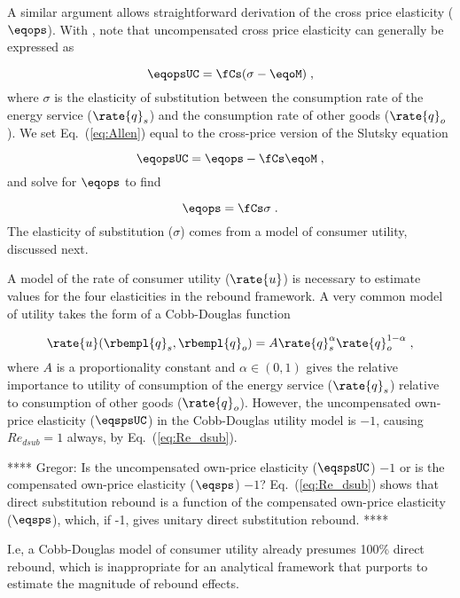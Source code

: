 A similar argument allows straightforward derivation 
of the cross price elasticity ($\eqops$).
With \citet{Hicks1934}, 
note that uncompensated cross price elasticity can generally be expressed as

\begin{equation} \label{eq:Allen}
  \eqopsUC = \fCs (\sigma - \eqoM) \; ,
\end{equation}
%
where $\sigma$ is the elasticity of substitution 
between the consumption rate of the energy service ($\rate{q}_s$) and
the consumption rate of other goods ($\rate{q}_o$). 
We set Eq.~(\ref{eq:Allen}) equal to 
the cross-price version of the Slutsky equation

\begin{equation} \label{eq:slutsky_cross}
  \eqopsUC = \eqops - \fCs \eqoM \; ,
\end{equation}
%
and solve for $\eqops$ to find

\begin{equation} \label{eq:eqops_general}
  \eqops = \fCs \sigma \; .
\end{equation}
%
The elasticity of substitution ($\sigma$)
comes from a model of consumer utility, discussed next.

A model of the rate of consumer utility ($\rate{u}$)
is necessary to estimate values for the four elasticities
in the rebound framework.
A very common model of utility takes the form of a Cobb-Douglas function

\begin{equation} \label{eq:CD_utility}
  \rate{u}(\rbempl{q}_s,\rbempl{q}_o) = A \rate{q}_s^\alpha \rate{q}_o^{1 - \alpha} \; ,
\end{equation}
%
where $A$ is a proportionality constant and 
$\alpha \in (0,1)$ gives the relative importance to utility 
of consumption of the energy service ($\rate{q}_s$)
relative to consumption of other goods ($\rate{q}_o$). 
However, the uncompensated own-price elasticity ($\eqspsUC$) 
in the Cobb-Douglas utility model is $-1$, 
causing $Re_{dsub} = 1$ always,
by Eq.~(\ref{eq:Re_dsub}).

**** Gregor: Is the uncompensated own-price elasticity ($\eqspsUC$) $-1$ 
or is the compensated own-price elasticity ($\eqsps$) $-1$?
Eq.~(\ref{eq:Re_dsub}) shows that direct substitution rebound is a function of the 
compensated own-price elasticity ($\eqsps$), which, if -1, gives unitary direct substitution rebound.
****

I.e, a Cobb-Douglas model of consumer utility already presumes 100\% direct rebound,
which is inappropriate for an analytical framework that purports to 
estimate the magnitude of rebound effects.

